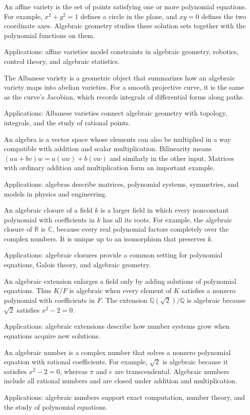 An affine variety is the set of points satisfying one or more polynomial equations. For example, $x^2+y^2=1$ defines a circle in the plane, and $xy=0$ defines the two coordinate axes. Algebraic geometry studies these solution sets together with the polynomial functions on them. \par\noindent Applications: affine varieties model constraints in algebraic geometry, robotics, control theory, and algebraic statistics.

The Albanese variety is a geometric object that summarizes how an algebraic variety maps into abelian varieties. For a smooth projective curve, it is the same as the curve's Jacobian, which records integrals of differential forms along paths. \par\noindent Applications: Albanese varieties connect algebraic geometry with topology, integrals, and the study of rational points.

An algebra is a vector space whose elements can also be multiplied in a way compatible with addition and scalar multiplication. Bilinearity means $(au+bv)w=a(uw)+b(vw)$ and similarly in the other input. Matrices with ordinary addition and multiplication form an important example. \par\noindent Applications: algebras describe matrices, polynomial systems, symmetries, and models in physics and engineering.

An algebraic closure of a field $k$ is a larger field in which every nonconstant polynomial with coefficients in $k$ has all its roots. For example, the algebraic closure of $\mathbb R$ is $\mathbb C$, because every real polynomial factors completely over the complex numbers. It is unique up to an isomorphism that preserves $k$. \par\noindent Applications: algebraic closures provide a common setting for polynomial equations, Galois theory, and algebraic geometry.

An algebraic extension enlarges a field only by adding solutions of polynomial equations. Thus $K/F$ is algebraic when every element of $K$ satisfies a nonzero polynomial with coefficients in $F$. The extension $\mathbb Q(\sqrt2)/\mathbb Q$ is algebraic because $\sqrt2$ satisfies $x^2-2=0$. \par\noindent Applications: algebraic extensions describe how number systems grow when equations acquire new solutions.

An algebraic number is a complex number that solves a nonzero polynomial equation with rational coefficients. For example, $\sqrt2$ is algebraic because it satisfies $x^2-2=0$, whereas $\pi$ and $e$ are transcendental. Algebraic numbers include all rational numbers and are closed under addition and multiplication. \par\noindent Applications: algebraic numbers support exact computation, number theory, and the study of polynomial equations.


